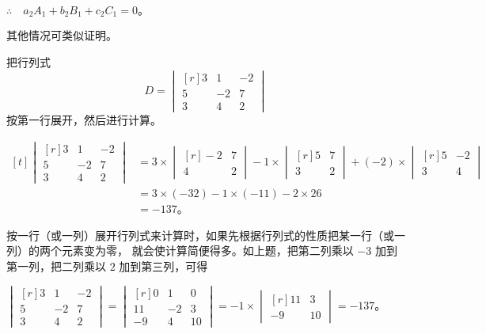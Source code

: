 $\therefore \quad a_2A_1 + b_2B_1 + c_2C_1 = 0 \text{。}$

其他情况可类似证明。

\liti 把行列式
$$
D =
\begin{vmatrix*}[r]
    3 & 1 & -2 \\
    5 & -2 & 7 \\
    3 & 4 & 2
\end{vmatrix*}
$$
按第一行展开，然后进行计算。

\jie \quad $\begin{aligned}[t]
    \begin{vmatrix*}[r]
        3 & 1 & -2 \\
        5 & -2 & 7 \\
        3 & 4 & 2
    \end{vmatrix*}
    &= 3 \times \begin{vmatrix*}[r]
                -2 & 7 \\
                4 & 2
            \end{vmatrix*}
        -1 \times   \begin{vmatrix*}[r]
                5 & 7 \\
                3 & 2
            \end{vmatrix*}
        + (-2) \times \begin{vmatrix*}[r]
                5 & -2 \\
                3 & 4
            \end{vmatrix*} \\
    &= 3 \times (-32) - 1 \times (-11) - 2 \times 26 \\
    &= -137 \text{。}
\end{aligned}$

按一行（或一列）展开行列式来计算时，如果先根据行列式的性质把某一行（或一列）的两个元素变为零，
就会使计算简便得多。如上题，把第二列乘以 $-3$ 加到第一列，把二列乘以 $2$ 加到第三列，可得

$\begin{vmatrix*}[r]
    3 & 1 & -2 \\
    5 & -2 & 7 \\
    3 & 4 & 2
\end{vmatrix*}
= \begin{vmatrix*}[r]
        0 & 1 & 0 \\
        11 & -2 & 3 \\
        -9 & 4 & 10
  \end{vmatrix*}
= -1 \times
    \begin{vmatrix*}[r]
        11 & 3 \\
        -9 & 10
    \end{vmatrix*}
= -137 \text{。}
$


